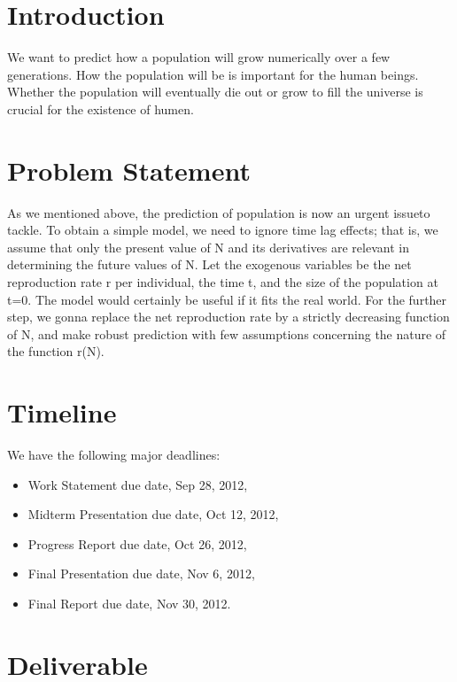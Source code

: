 \documentclass[12pt,letterpaper]{article}
\theoremstyle{definition}
\begin{document}
\def\shiftdowna{0.32in}  %
\def\shiftdownb{0.22in}  %


\section{Introduction} 
We want to predict how a population will grow numerically over a few generations. How the population will be is important for the human beings. Whether the population will eventually die out or grow to fill the universe is crucial for the existence of humen.

\section{Problem Statement}
As we mentioned above, the prediction of population is now an urgent issueto tackle. To obtain a simple model, we need to ignore time lag effects; that is, we assume that only the present value of N and its derivatives are relevant in determining the future values of N. Let the exogenous variables be the net reproduction rate r per individual, the time t, and the size of the population at t=0. The model would certainly be useful if it fits the real world. For the further step, we gonna replace the net reproduction rate by a strictly decreasing function of N, and make robust prediction with few assumptions concerning the nature of the function r(N).  

  
\section{Timeline}
We have the following major deadlines:
\begin{itemize}
    \item Work Statement due date, Sep 28, 2012,
    \item Midterm Presentation due date, Oct 12, 2012,
    \item Progress Report due date, Oct 26, 2012,
    \item Final Presentation due date, Nov 6, 2012,
    \item Final Report due date, Nov 30, 2012.
\end{itemize}

\section{Deliverable}
\end{document}

